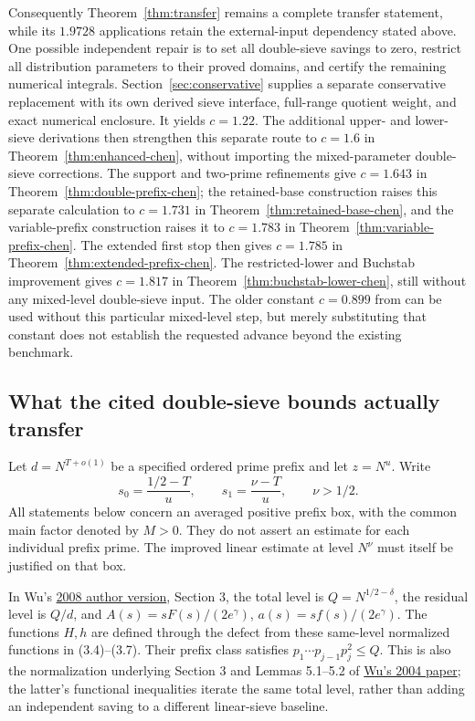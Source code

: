 \documentclass[11pt]{article}
\begin{document}
Consequently Theorem~\ref{thm:transfer} remains a complete transfer
statement, while its $1.9728$ applications retain the external-input
dependency stated above. One possible independent repair is to set all
double-sieve savings to zero, restrict all distribution parameters to
their proved domains, and certify the remaining numerical integrals.
Section~\ref{sec:conservative} supplies a separate conservative
replacement with its own derived sieve interface, full-range quotient
weight, and exact numerical enclosure. It yields $c=1.22$.
The additional upper- and lower-sieve derivations then strengthen
this separate route to $c=1.6$ in Theorem~\ref{thm:enhanced-chen},
without importing the mixed-parameter double-sieve corrections.
The support and two-prime refinements give $c=1.643$
in Theorem~\ref{thm:double-prefix-chen}; the retained-base construction
raises this separate calculation to $c=1.731$ in
Theorem~\ref{thm:retained-base-chen}, and the variable-prefix
construction raises it to $c=1.783$ in
Theorem~\ref{thm:variable-prefix-chen}. The extended first stop
then gives $c=1.785$ in Theorem~\ref{thm:extended-prefix-chen}.
The restricted-lower and Buchstab improvement gives $c=1.817$
in Theorem~\ref{thm:buchstab-lower-chen}, still without any
mixed-level double-sieve input.
The older constant $c=0.899$ from \cite{Wu2008} can be
used without this particular mixed-level step, but merely substituting
that constant does not establish the requested advance beyond the
existing benchmark.


\subsection{What the cited double-sieve bounds actually transfer}
\label{sec:external-chen-input-resolution}

Let $d=N^{T+o(1)}$ be a specified ordered prime prefix and let
$z=N^u$. Write
\[
 s_0=\frac{1/2-T}{u},\qquad s_1=\frac{\nu-T}{u},
 \qquad \nu>1/2.
\]
All statements below concern an averaged positive prefix box,
with the common main factor denoted by $M>0$. They do not assert
an estimate for each individual prefix prime.
The improved linear estimate at level $N^\nu$ must itself be
justified on that box.

In Wu's \href{https://arxiv.org/pdf/0709.3764}{2008 author version},
Section 3, the total level is $Q=N^{1/2-\delta}$, the residual
level is $Q/d$, and $A(s)=sF(s)/(2e^\gamma)$,
$a(s)=sf(s)/(2e^\gamma)$.
The functions $H,h$ are defined through the defect from these
same-level normalized functions in (3.4)--(3.7).
Their prefix class satisfies
$p_1\cdots p_{j-1}p_j^2\le Q$.
This is also the normalization underlying Section 3 and Lemmas
5.1--5.2 of
\href{https://www.impan.pl/shop/en/publication/transaction/download/product/82961}
{Wu's 2004 paper}; the latter's functional inequalities iterate
the same total level, rather than adding an independent saving
to a different linear-sieve baseline.
\end{document}
